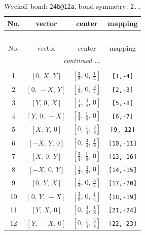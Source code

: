 \documentclass[fleqn,8pt]{jsarticle}
\begin{document}
\begin{longtable}{cccc}
\caption{Wyckoff bond: {\tt 24b@12a}, bond symmetry: {\tt 2..}}
 \\
 \hline \hline
No. & vector & center & mapping \\ \hline \endfirsthead

\multicolumn{3}{l}{\tablename\ \thetable{}} \\
 \hline \hline
No. & vector & center & mapping \\ \hline \endhead

 \hline \hline
\multicolumn{3}{r}{\footnotesize\it continued ...} \\ \endfoot

 \hline \hline
\multicolumn{3}{r}{} \\ \endlastfoot

1 & $\left[ 0,\, X,\, Y \right]$ & $\left[ \frac{3}{8},\, 0,\, \frac{1}{4} \right]$ & {\tt [1,-4]} \\ \hline
2 & $\left[ 0,\, - X,\, Y \right]$ & $\left[ \frac{1}{8},\, 0,\, \frac{3}{4} \right]$ & {\tt [2,-3]} \\ \hline
3 & $\left[ Y,\, 0,\, X \right]$ & $\left[ \frac{1}{4},\, \frac{3}{8},\, 0 \right]$ & {\tt [5,-8]} \\ \hline
4 & $\left[ Y,\, 0,\, - X \right]$ & $\left[ \frac{3}{4},\, \frac{1}{8},\, 0 \right]$ & {\tt [6,-7]} \\ \hline
5 & $\left[ X,\, Y,\, 0 \right]$ & $\left[ 0,\, \frac{1}{4},\, \frac{3}{8} \right]$ & {\tt [9,-12]} \\ \hline
6 & $\left[ - X,\, Y,\, 0 \right]$ & $\left[ 0,\, \frac{3}{4},\, \frac{1}{8} \right]$ & {\tt [10,-11]} \\ \hline
7 & $\left[ X,\, 0,\, Y \right]$ & $\left[ \frac{3}{4},\, \frac{1}{8},\, 0 \right]$ & {\tt [13,-16]} \\ \hline
8 & $\left[ - X,\, 0,\, Y \right]$ & $\left[ \frac{1}{4},\, \frac{3}{8},\, 0 \right]$ & {\tt [14,-15]} \\ \hline
9 & $\left[ 0,\, Y,\, X \right]$ & $\left[ \frac{1}{8},\, 0,\, \frac{3}{4} \right]$ & {\tt [17,-20]} \\ \hline
10 & $\left[ 0,\, Y,\, - X \right]$ & $\left[ \frac{3}{8},\, 0,\, \frac{1}{4} \right]$ & {\tt [18,-19]} \\ \hline
11 & $\left[ Y,\, X,\, 0 \right]$ & $\left[ 0,\, \frac{3}{4},\, \frac{1}{8} \right]$ & {\tt [21,-24]} \\ \hline
12 & $\left[ Y,\, - X,\, 0 \right]$ & $\left[ 0,\, \frac{1}{4},\, \frac{3}{8} \right]$ & {\tt [22,-23]} \\
\end{longtable}
\end{document}
